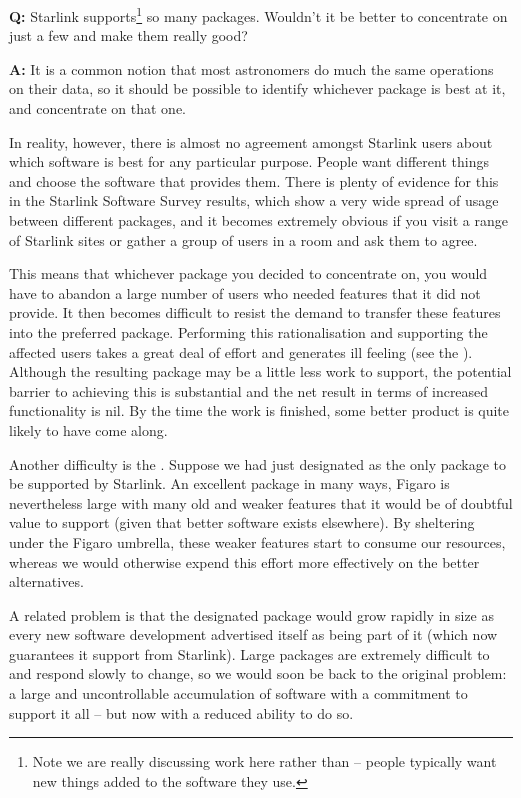 {\Large \bf Q:} Starlink supports\footnote{Note we are really
discussing \st{} work here rather than \st{} --
people typically want new things added to the software they use.} so
many packages.  Wouldn't it be better to concentrate on just a few and
make them really good?

{\Large \bf A:} It is a common notion that most astronomers do much the
same operations on their data, so it should be possible to identify
whichever package is best at it, and concentrate on that one.

In reality, however, there is almost no agreement amongst Starlink
users about which software is best for any particular purpose.  People
want different things and choose the software that provides them.
There is plenty of evidence for this in the Starlink Software Survey
results, which show a very wide spread of usage between different
packages, and it becomes extremely obvious if you visit a range of
Starlink sites or gather a group of users in a room and ask them to
agree.

This means that whichever package you decided to concentrate on, you
would have to abandon a large number of users who needed features that
it did not provide. It then becomes difficult to resist the demand to
transfer these features into the preferred package. Performing this
rationalisation and supporting the affected users takes a great deal
of effort and generates ill feeling (see the ). Although the resulting package may be a
little less work to support, the potential barrier to achieving this
is substantial and the net result in terms of increased functionality
is nil. By the time the work is finished, some better product is quite
likely to have come along.

Another difficulty is the . Suppose we had just
designated  as the only package to be supported by
Starlink. An excellent package in many ways, Figaro is nevertheless
large with many old and weaker features that it would be of doubtful
value to support (given that better software exists elsewhere). By
sheltering under the Figaro umbrella, these weaker features start to
consume our resources, whereas we would otherwise expend this effort
more effectively on the better alternatives.

A related problem is that the designated package would grow rapidly in
size as every new software development advertised itself as being part
of it (which now guarantees it support from Starlink).  Large packages
are extremely difficult to \st{} and respond slowly to
change, so we would soon be back to the original problem: a large and
uncontrollable accumulation of software with a commitment to support
it all -- but now with a reduced ability to do so.

